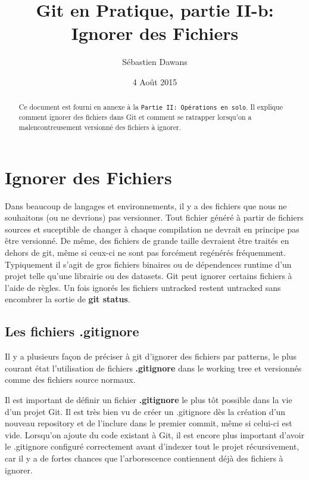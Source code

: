 \documentclass{../../common/tufte-latex/tufte-handout}
\title{Git en Pratique, partie II-b: Ignorer des Fichiers}
\author{S\'ebastien Dawans}
\date{4 Ao\^ut 2015} %
\begin{document}
\maketitle%

\begin{abstract}
\noindent
Ce document est fourni en annexe à la \texttt{Partie II: Op\'erations en solo}. Il explique comment ignorer des fichiers dans Git et comment se ratrapper lorsqu'on a malencontreusement versionné des fichiers à ignorer.
\end{abstract}

\section{Ignorer des Fichiers}
\label{section:ignore}
Dans beaucoup de langages et environnements, il y a des fichiers que nous ne souhaitons (ou ne devrions) pas versionner.
Tout fichier généré à partir de fichiers sources et suceptible de changer à chaque compilation ne devrait en principe pas être versionné.
De même, des fichiers de grande taille devraient être traités en dehors de git, même si ceux-ci ne sont pas forcément regénérés fréquemment.
Typiquement il s'agit de gros fichiers binaires ou de dépendences runtime d'un projet telle qu'une librairie ou des datasets.
Git peut ignorer certains fichiers à l'aide de règles.
Un fois ignorés les fichiers untracked restent untracked sans encombrer la sortie de \textbf{git status}.

\subsection{Les fichiers .gitignore}
Il y a plusieurs façon de préciser à git d'ignorer des fichiers par patterns, le plus courant état l'utilisation de fichiers \textbf{.gitignore} dans le working tree et versionnés comme des fichiers source normaux.

Il est important de définir un fichier \textbf{.gitignore} le plus tôt possible dans la vie d'un projet Git.
Il est très bien vu de créer un .gitignore dès la création d'un nouveau repository et de l'inclure dans le premier commit, même si celui-ci est vide.
Lorsqu'on ajoute du code existant à Git, il est encore plus important d'avoir le .gitignore configuré correctement avant d'indexer tout le projet récursivement, car il y a de fortes chances que l'arborescence contiennent déjà des fichiers à ignorer.
\end{document}
